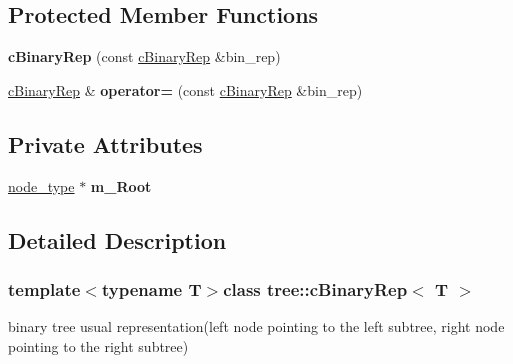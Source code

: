 \subsection*{\-Protected \-Member \-Functions}
\begin{DoxyCompactItemize}
\item 
\hypertarget{classtree_1_1cBinaryRep_a2b7e8d490a1e5f4b5c58fb58e29330ef}{{\bfseries c\-Binary\-Rep} (const \hyperlink{classtree_1_1cBinaryRep}{c\-Binary\-Rep} \&bin\-\_\-rep)}\label{classtree_1_1cBinaryRep_a2b7e8d490a1e5f4b5c58fb58e29330ef}

\item 
\hypertarget{classtree_1_1cBinaryRep_a4c6eb53e4805dcb0ac0032289bb7d0d8}{\hyperlink{classtree_1_1cBinaryRep}{c\-Binary\-Rep} \& {\bfseries operator=} (const \hyperlink{classtree_1_1cBinaryRep}{c\-Binary\-Rep} \&bin\-\_\-rep)}\label{classtree_1_1cBinaryRep_a4c6eb53e4805dcb0ac0032289bb7d0d8}

\end{DoxyCompactItemize}
\subsection*{\-Private \-Attributes}
\begin{DoxyCompactItemize}
\item 
\hypertarget{classtree_1_1cBinaryRep_acc04e77d74d4c7be7aceb048d512965a}{\hyperlink{structtree_1_1btree__node}{node\-\_\-type} $\ast$ {\bfseries m\-\_\-\-Root}}\label{classtree_1_1cBinaryRep_acc04e77d74d4c7be7aceb048d512965a}

\end{DoxyCompactItemize}


\subsection{\-Detailed \-Description}
\subsubsection*{template$<$typename T$>$class tree\-::c\-Binary\-Rep$<$ T $>$}

binary tree usual representation(left node pointing to the left subtree, right node pointing to the right subtree) 

